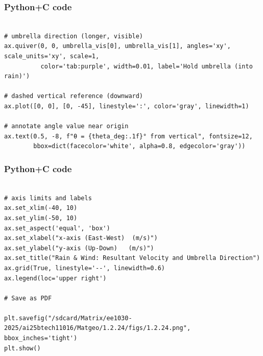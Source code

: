 \documentclass{beamer}
\begin{document}
\begin{frame}[fragile]
    \frametitle{Python+C code}
    \begin{lstlisting}
 
# umbrella direction (longer, visible)
ax.quiver(0, 0, umbrella_vis[0], umbrella_vis[1], angles='xy', scale_units='xy', scale=1,
          color='tab:purple', width=0.01, label='Hold umbrella (into rain)')

# dashed vertical reference (downward)
ax.plot([0, 0], [0, -45], linestyle=':', color='gray', linewidth=1)

# annotate angle value near origin
ax.text(0.5, -8, f"θ = {theta_deg:.1f}° from vertical", fontsize=12,
        bbox=dict(facecolor='white', alpha=0.8, edgecolor='gray'))
\end{lstlisting}
\end{frame}
\begin{frame}[fragile]
    \frametitle{Python+C code}
    \begin{lstlisting}

# axis limits and labels
ax.set_xlim(-40, 10)
ax.set_ylim(-50, 10)
ax.set_aspect('equal', 'box')
ax.set_xlabel("x-axis (East-West)  (m/s)")
ax.set_ylabel("y-axis (Up-Down)   (m/s)")
ax.set_title("Rain & Wind: Resultant Velocity and Umbrella Direction")
ax.grid(True, linestyle='--', linewidth=0.6)
ax.legend(loc='upper right')

# Save as PDF

plt.savefig("/sdcard/Matrix/ee1030-2025/ai25btech11016/Matgeo/1.2.24/figs/1.2.24.png", bbox_inches='tight')
plt.show()

 \end{lstlisting}
 
\end{frame}
\end{document}
